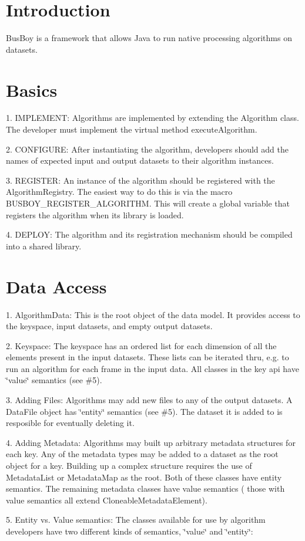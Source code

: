 \hypertarget{index_intro_sec}{}\section{Introduction}\label{index_intro_sec}
BusBoy is a framework that allows Java to run native processing algorithms on datasets. \hypertarget{index_basics}{}\section{Basics}\label{index_basics}
1. IMPLEMENT: Algorithms are implemented by extending the Algorithm class. The developer must implement the virtual method executeAlgorithm.

2. CONFIGURE: After instantiating the algorithm, developers should add the names of expected input and output datasets to their algorithm instances.

3. REGISTER: An instance of the algorithm should be registered with the AlgorithmRegistry. The easiest way to do this is via the macro BUSBOY\_\-REGISTER\_\-ALGORITHM. This will create a global variable that registers the algorithm when its library is loaded.

4. DEPLOY: The algorithm and its registration mechanism should be compiled into a shared library.\hypertarget{index_dataaccess}{}\section{Data Access}\label{index_dataaccess}
1. AlgorithmData: This is the root object of the data model. It provides access to the keyspace, input datasets, and empty output datasets.

2. Keyspace: The keyspace has an ordered list for each dimension of all the elements present in the input datasets. These lists can be iterated thru, e.g. to run an algorithm for each frame in the input data. All classes in the key api have \char`\"{}value\char`\"{} semantics (see \#5).

3. Adding Files: Algorithms may add new files to any of the output datasets. A DataFile object has \char`\"{}entity\char`\"{} semantics (see \#5). The dataset it is added to is resposible for eventually deleting it.

4. Adding Metadata: Algorithms may built up arbitrary metadata structures for each key. Any of the metadata types may be added to a dataset as the root object for a key. Building up a complex structure requires the use of MetadataList or MetadataMap as the root. Both of these classes have entity semantics. The remaining metadata classes have value semantics ( those with value semantics all extend CloneableMetadataElement).

5. Entity vs. Value semantics: The classes available for use by algorithm developers have two different kinds of semantics, \char`\"{}value\char`\"{} and \char`\"{}entity\char`\"{}: 